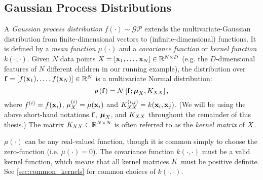 \subsection{Gaussian Process Distributions}
A \emph{Gaussian process distribution} $f(\cdot) \sim \mathcal{GP}$ extends the multivariate-Gaussian distribution from finite-dimensional vectors to (infinite-dimensional) functions.
It is defined by a \emph{mean function} $\mu(\cdot)$ and a \emph{covariance function} or \emph{kernel function} $k(\cdot, \cdot)$.
Given $N$ data points $X = [ \mathbf{x}_1, \ldots, \mathbf{x}_N ] \in \mathbb{R}^{N \times D}$ (e.g. the $D$-dimensional features of $N$ different children in our running example),
the distribution over $\mathbf{f} = [ f(\mathbf{x}_1), \ldots, f(\mathbf{x}_N) ] \in \mathbb{R}^{N}$ is a multivariate Normal distribution:
\begin{equation}
 p \left( \mathbf{f} \right) = \mathcal{N} \left[  \mathbf{f} ; \boldsymbol{\mu}_{X},  K_{XX}  \right],
 \label{eqn:prior_finite}
\end{equation}
where $f^{(i)} = f(\mathbf{x}_i)$, $\mu^{(i)}_{X} = \mu( \mathbf{x}_i )$ and $K_{XX}^{(i,j)} = k(\mathbf{x}_i, \mathbf{x}_j)$.
(We will be using the above short-hand notations $\mathbf{f}$, $\boldsymbol{\mu}_{X}$, and $K_{XX}$ throughout the remainder of this thesis.)
The matrix $K_{XX} \in \mathbb{R}^{N \times N}$ is often referred to as the \emph{kernel matrix} of $X$.

$\mu(\cdot)$ can be any real-valued function, though it is common simply to choose the zero-function (i.e. $\mu(\cdot) = 0$).
The covariance function $k(\cdot, \cdot)$ must be a valid kernel function, which means that all kernel matrices $K$ must be positive definite.
See \cref{sec:common_kernels} for common choices of $k(\cdot, \cdot)$.

